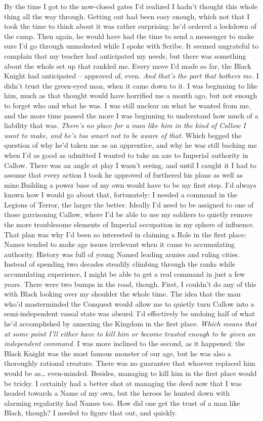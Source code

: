 \documentclass[12pt, openany]{book}
\begin{document}
By the time I got to the now-closed gates I’d realized I hadn’t thought this whole thing all the way through. Getting out had been easy enough, which not that I took the time to think about it was rather surprising: he’d ordered a lockdown of the camp. Then again, he would have had the time to send a messenger to make sure I’d go through unmolested while I spoke with Scribe. It seemed ungrateful to complain that my teacher had anticipated my needs, but there was something about the whole set up that rankled me. Every move I’d made so far, the Black Knight had anticipated – approved of, even. \textit{And that’s the part that bothers me.} I didn’t trust the green-eyed man, when it came down to it. I was beginning to like him, much as that thought would have horrified me a month ago, but not enough to forget who and what he was. I was still unclear on what he wanted from me, and the more time passed the more I was beginning to understand how much of a liability that was. \textit{There’s no place for a man like him in the kind of Callow I want to make, and he’s too smart not to be aware of that.} Which begged the question of why he’d taken me as an apprentice, and why he was still backing me when I’d as good as admitted I wanted to take an axe to Imperial authority in Callow.
There was an angle at play I wasn’t seeing, and until I caught it I had to assume that every action I took he approved of furthered his plans as well as mine.Building a power base of my own would have to be my first step. I’d always known how I would go about that, fortunately: I needed a command in the Legions of Terror, the larger the better. Ideally I’d need to be assigned to one of those garrisoning Callow, where I’d be able to use my soldiers to quietly remove the more troublesome elements of Imperial occupation in my sphere of influence. That plan was why I’d been so interested in claiming a Role in the first place: Names tended to make age issues irrelevant when it came to accumulating authority. History was full of young Named leading armies and ruling cities. Instead of spending two decades steadily climbing through the ranks while accumulating experience, I might be able to get a real command in just a few years. There were two bumps in the road, though.
First, I couldn’t do any of this with Black looking over my shoulder the whole time. The idea that the man who’d masterminded the Conquest would allow me to quietly turn Callow into a semi-independent vassal state was absurd. I’d effectively be undoing half of what he’d accomplished by annexing the Kingdom in the first place. \textit{Which means that at some point I’ll either have to kill him or become trusted enough to be given an independent command.} I was more inclined to the second, as it happened: the Black Knight was the most famous monster of our age, but he was also a thoroughly rational creature. There was no guarantee that whoever replaced him would be as… even-minded. Besides, managing to kill him in the first place would be tricky. I certainly had a better shot at managing the deed now that I was headed towards a Name of my own, but the heroes he hunted down with alarming regularity had Names too. How did one get the trust of a man like Black, though? I needed to figure that out, and quickly.
\end{document}
